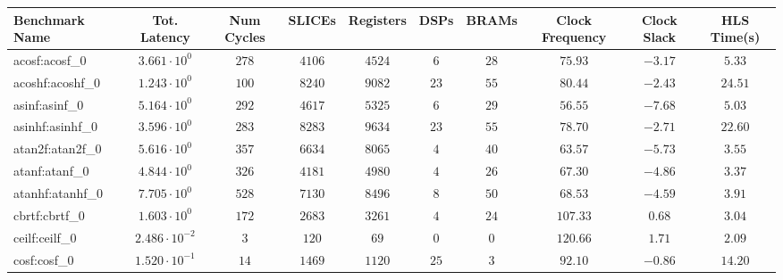 \begin{tabular}{|l|c|c|c|c|c|c|c|c|c|}
\hline
Benchmark Name           & Tot. Latency            & Num Cycles & SLICEs     & Registers  & DSPs    & BRAMs   & Clock Frequency & Clock Slack & HLS Time(s) \\
\hline
acosf:acosf\_0           & $ 3.661 \cdot 10^{0}  $ & $ 278    $ & $ 4106   $ & $ 4524   $ & $ 6   $ & $ 28  $ & $ 75.93       $ & $ -3.17   $ & $ 5.33    $ \\
acoshf:acoshf\_0         & $ 1.243 \cdot 10^{0}  $ & $ 100    $ & $ 8240   $ & $ 9082   $ & $ 23  $ & $ 55  $ & $ 80.44       $ & $ -2.43   $ & $ 24.51   $ \\
asinf:asinf\_0           & $ 5.164 \cdot 10^{0}  $ & $ 292    $ & $ 4617   $ & $ 5325   $ & $ 6   $ & $ 29  $ & $ 56.55       $ & $ -7.68   $ & $ 5.03    $ \\
asinhf:asinhf\_0         & $ 3.596 \cdot 10^{0}  $ & $ 283    $ & $ 8283   $ & $ 9634   $ & $ 23  $ & $ 55  $ & $ 78.70       $ & $ -2.71   $ & $ 22.60   $ \\
atan2f:atan2f\_0         & $ 5.616 \cdot 10^{0}  $ & $ 357    $ & $ 6634   $ & $ 8065   $ & $ 4   $ & $ 40  $ & $ 63.57       $ & $ -5.73   $ & $ 3.55    $ \\
atanf:atanf\_0           & $ 4.844 \cdot 10^{0}  $ & $ 326    $ & $ 4181   $ & $ 4980   $ & $ 4   $ & $ 26  $ & $ 67.30       $ & $ -4.86   $ & $ 3.37    $ \\
atanhf:atanhf\_0         & $ 7.705 \cdot 10^{0}  $ & $ 528    $ & $ 7130   $ & $ 8496   $ & $ 8   $ & $ 50  $ & $ 68.53       $ & $ -4.59   $ & $ 3.91    $ \\
cbrtf:cbrtf\_0           & $ 1.603 \cdot 10^{0}  $ & $ 172    $ & $ 2683   $ & $ 3261   $ & $ 4   $ & $ 24  $ & $ 107.33      $ & $ 0.68    $ & $ 3.04    $ \\
ceilf:ceilf\_0           & $ 2.486 \cdot 10^{-2} $ & $ 3      $ & $ 120    $ & $ 69     $ & $ 0   $ & $ 0   $ & $ 120.66      $ & $ 1.71    $ & $ 2.09    $ \\
cosf:cosf\_0             & $ 1.520 \cdot 10^{-1} $ & $ 14     $ & $ 1469   $ & $ 1120   $ & $ 25  $ & $ 3   $ & $ 92.10       $ & $ -0.86   $ & $ 14.20   $ \\

\end{tabular}
